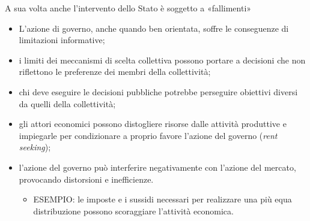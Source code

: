 \documentclass[aspectratio=64,12pt]{beamer}
\begin{document}
\begin{frame}{A sua volta anche l'intervento dello Stato è soggetto a «fallimenti»}
\begin{itemize}
\item L'azione di governo, anche quando ben orientata, soffre le conseguenze di
limitazioni informative;
\item i limiti dei meccanismi di scelta collettiva possono portare a decisioni che
non riflettono le preferenze dei membri della collettività;
\item chi deve eseguire le decisioni pubbliche potrebbe perseguire obiettivi
diversi da quelli della collettività;
\item gli attori economici possono distogliere risorse dalle attività produttive e
impiegarle per condizionare a proprio favore l’azione del governo (\emph{rent
seeking});
\item l'azione del governo può interferire negativamente con l'azione del mercato,
provocando distorsioni e inefficienze.
\begin{itemize}
\item ESEMPIO: le imposte e i sussidi necessari per realizzare una più equa
distribuzione possono scoraggiare l'attività economica.
\end{itemize}
\end{itemize}
\end{frame}
\end{document}
